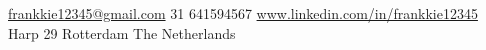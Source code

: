 \documentclass[10pt,a4paper]{article}
\begin{document}
\sloppy  %


\nobreakvspace{0.3em}  %

\noindent\href{mailto:frankkie12345@gmail.com}{frankkie12345\mbox{}@\mbox{}gmail.com}\sbull
\textsmaller{+}31 641594567\sbull
\href{http://www.linkedin.com/in/frankkie12345}{www.linkedin.com/in/frankkie12345}
\\
Harp 29\sbull
Rotterdam\sbull
The Netherlands

\spacedhrule{0.9em}{-0.4em}  %

\end{document}
